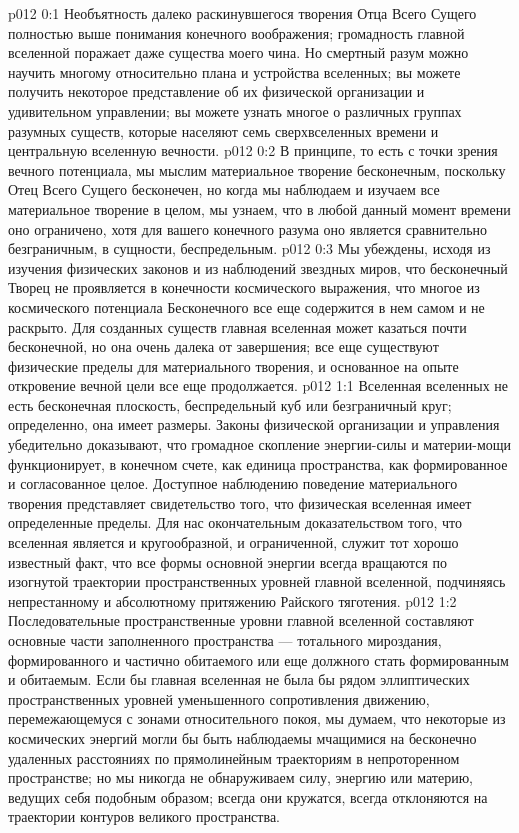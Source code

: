 \author{Совершенствователь Мудрости}
\vs p012 0:1 Необъятность далеко раскинувшегося творения Отца Всего Сущего полностью выше понимания конечного воображения; громадность главной вселенной поражает даже существа моего чина. Но смертный разум можно научить многому относительно плана и устройства вселенных; вы можете получить некоторое представление об их физической организации и удивительном управлении; вы можете узнать многое о различных группах разумных существ, которые населяют семь сверхвселенных времени и центральную вселенную вечности.
\vs p012 0:2 В принципе, то есть с точки зрения вечного потенциала, мы мыслим материальное творение бесконечным, поскольку Отец Всего Сущего бесконечен, но когда мы наблюдаем и изучаем все материальное творение в целом, мы узнаем, что в любой данный момент времени оно ограничено, хотя для вашего конечного разума оно является сравнительно безграничным, в сущности, беспредельным.
\vs p012 0:3 Мы убеждены, исходя из изучения физических законов и из наблюдений звездных миров, что бесконечный Творец не проявляется в конечности космического выражения, что многое из космического потенциала Бесконечного все еще содержится в нем самом и не раскрыто. Для созданных существ главная вселенная может казаться почти бесконечной, но она очень далека от завершения; все еще существуют физические пределы для материального творения, и основанное на опыте откровение вечной цели все еще продолжается.
\vs p012 1:1 Вселенная вселенных не есть бесконечная плоскость, беспредельный куб или безграничный круг; определенно, она имеет размеры. Законы физической организации и управления убедительно доказывают, что громадное скопление энергии\hyp{}силы и материи\hyp{}мощи функционирует, в конечном счете, как единица пространства, как формированное и согласованное целое. Доступное наблюдению поведение материального творения представляет свидетельство того, что физическая вселенная имеет определенные пределы. Для нас окончательным доказательством того, что вселенная является и кругообразной, и ограниченной, служит тот хорошо известный факт, что все формы основной энергии всегда вращаются по изогнутой траектории пространственных уровней главной вселенной, подчиняясь непрестанному и абсолютному притяжению Райского тяготения.
\vs p012 1:2 Последовательные пространственные уровни главной вселенной составляют основные части заполненного пространства --- тотального мироздания, формированного и частично обитаемого или еще должного стать формированным и обитаемым. Если бы главная вселенная не была бы рядом эллиптических пространственных уровней уменьшенного сопротивления движению, перемежающемуся с зонами относительного покоя, мы думаем, что некоторые из космических энергий могли бы быть наблюдаемы мчащимися на бесконечно удаленных расстояниях по прямолинейным траекториям в непроторенном пространстве; но мы никогда не обнаруживаем силу, энергию или материю, ведущих себя подобным образом; всегда они кружатся, всегда отклоняются на траектории контуров великого пространства.
